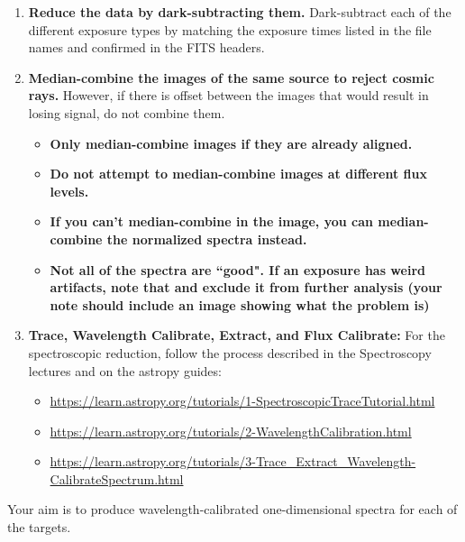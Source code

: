 \documentclass[11pt]{article}
\begin{document}
\begin{enumerate}
    \item \textbf{Reduce the data by dark-subtracting them.}
Dark-subtract each of the different exposure types by matching the exposure times listed in the file names and confirmed in the FITS headers.

\item \textbf{Median-combine the images of the same source to reject cosmic rays.}
    However, if there is offset between the images that would result in losing signal, do not combine them.
\begin{itemize}
    \item \textbf{Only median-combine images if they are already aligned.}
    \item \textbf{Do not attempt to median-combine images at different flux levels.}
    \item \textbf{If you can't median-combine in the image, you can median-combine the normalized spectra instead.}
    \item \textbf{Not all of the spectra are ``good".  If an exposure has weird artifacts, note that and exclude it from further analysis (your note should include an image showing what the problem is)}
\end{itemize}

    \item \textbf{Trace, Wavelength Calibrate, Extract, and Flux Calibrate:} For the spectroscopic reduction, follow the process described in the
Spectroscopy lectures and on the astropy guides:

\begin{itemize}
    \item \url{https://learn.astropy.org/tutorials/1-SpectroscopicTraceTutorial.html}
    \item \url{https://learn.astropy.org/tutorials/2-WavelengthCalibration.html}
    \item \url{https://learn.astropy.org/tutorials/3-Trace_Extract_Wavelength-CalibrateSpectrum.html}
\end{itemize}

\end{enumerate}

Your aim is to produce wavelength-calibrated one-dimensional spectra for each of the targets.

\end{document}
